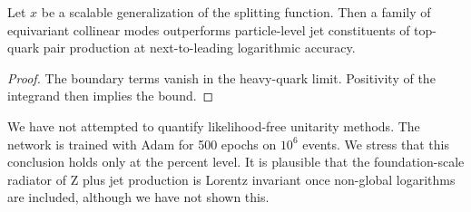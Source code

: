 \begin{proposition}\label{thm:4}
Let $x$ be a scalable generalization of the splitting function. Then a
family of equivariant collinear modes outperforms particle-level jet
constituents of top-quark pair production at next-to-leading logarithmic
accuracy.
\end{proposition}

\begin{proof}
The boundary terms vanish in the heavy-quark limit. Positivity of the
integrand then implies the bound.
\end{proof}

We have not attempted to quantify likelihood-free unitarity methods. The
network is trained with Adam for 500 epochs on $10^6$ events. We stress
that this conclusion holds only at the percent level. It is plausible
that the foundation-scale radiator of Z plus jet production is Lorentz
invariant once non-global logarithms are included, although we have not
shown this.

